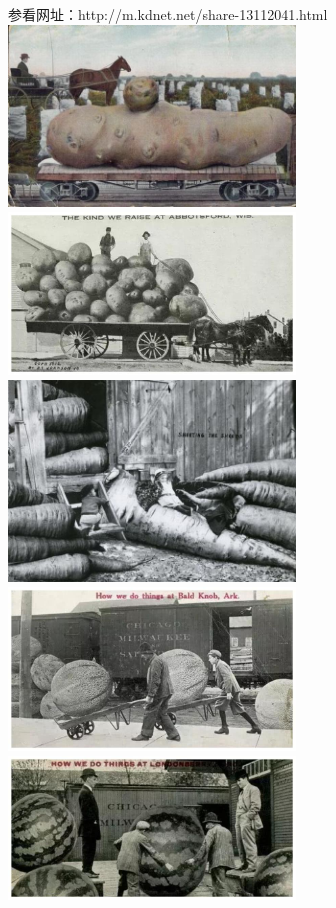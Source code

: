 \documentclass[UTF8,a4paper]{ctexart}
\begin{document}
参看网址：http://m.kdnet.net/share-13112041.html\\
\includegraphics[width=3in]{us_potatoes.jpg}\\
\includegraphics[width=3in]{us_potatoes2.jpg}\\
\includegraphics[width=3in]{us_carrots.jpg}\\
\includegraphics[width=3in]{us_melons.jpg}\\
\includegraphics[width=3in]{us_melons2.jpg}\\
\end{document}
